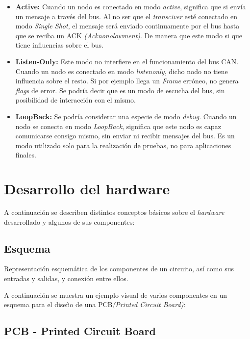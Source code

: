 \begin{itemize}
\item
\textbf{Active:} Cuando un nodo es conectado en modo \emph{active}, significa que si envía un mensaje a través del bus. Al no ser que el \emph{transciver} esté conectado en modo \emph{Single Shot}, el mensaje será enviado continuamente por el bus hasta que se reciba un ACK \emph{(Acknonolowment)}. De manera que este modo si que tiene influencias sobre el bus.

\item
\textbf{Listen-Only:} Este modo no interfiere en el funcionamiento del bus CAN. Cuando un nodo es conectado en modo \emph{listenonly}, dicho nodo no tiene influencia sobre el resto. Si por ejemplo llega un \emph{Frame} erróneo, no genera \emph{flags} de error. Se podría decir que es un modo de escucha del bus, sin posibilidad de interacción con el mismo.

\item
\textbf{LoopBack:} Se podría considerar una especie de modo \emph{debug}. Cuando un nodo se conecta en modo \emph{LoopBack}, significa que este nodo es capaz comunicarse consigo mismo, sin enviar ni recibir mensajes del bus. Es un modo utilizado solo para la realización de pruebas, no para aplicaciones finales.

\end{itemize}


\section{Desarrollo del hardware}\label{desarrollo_del_hardware}

A continuación se describen distintos conceptos básicos sobre el \emph{hardware} desarrollado y algunos de sus componentes:

\subsection{Esquema}\label{esquema}

Representación esquemática de los componentes de un circuito, así como sus entradas y salidas, y conexión entre ellos.

A continuación se muestra un ejemplo visual de varios componentes en un esquema para el diseño de una PCB\emph{(Printed Circuit Board)}:


\subsection{PCB - Printed Circuit Board}\label{pcb_printed_circuit_board}


